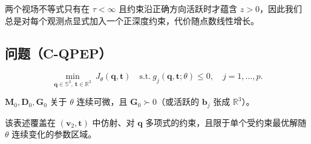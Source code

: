 两个视场不等式只有在 $\tau<\infty$ 且约束沿正确方向活跃时才蕴含 $z>0$，因此我们总是对每个观测点显式加入一个正深度约束，代价随点数线性增长。

\subsection{问题（C-QPEP）}\label{sec:cqpep}
\begin{equation}
\min_{\mathbf q\in\mathbb{S}^3,\ \mathbf t\in\mathbb{R}^3}\ J_\theta(\mathbf q,\mathbf t)\quad\text{s.t.}\ g_j(\mathbf q,\mathbf t;\theta)\le0,\quad j=1,\dots,p. \tag{C-QPEP}
\end{equation}
\begin{assumption}\label{asm:main}
$\mathbf M_0,\mathbf D_0,\mathbf G_0$ 关于 $\theta$ 连续可微，且 $\mathbf G_0\succ0$（或活跃的 $\mathbf b_j$ 张成 $\mathbb{R}^3$）。
\end{assumption}
该表述覆盖在 $(\mathbf v_2,\mathbf t)$ 中仿射、对 $\mathbf q$ 多项式的约束，且限于单个受约束最优解随 $\theta$ 连续变化的参数区域。
